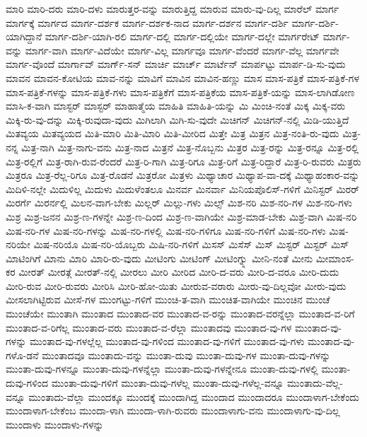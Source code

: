 {ಮಾರಿ
ಮಾರಿ-ದರು
ಮಾರಿ-ದಳು
ಮಾರುತ್ತರ-ವನ್ನು
ಮಾರುತ್ತಿದ್ದ
ಮಾರುವ
ಮಾರು-ವು-ದಿಲ್ಲ
ಮಾರೆಲ್
ಮಾರ್ಗ
ಮಾರ್ಗಕ್ಕೆ
ಮಾರ್ಗದ
ಮಾರ್ಗ-ದರ್ಶಕ
ಮಾರ್ಗ-ದರ್ಶಕ-ನಾದ
ಮಾರ್ಗ-ದರ್ಶನ
ಮಾರ್ಗ-ದರ್ಶಿ
ಮಾರ್ಗ-ದರ್ಶಿ-ಯಾಗಿದ್ದಾನೆ
ಮಾರ್ಗ-ದರ್ಶಿ-ಯಾಗಿ-ರಲಿ
ಮಾರ್ಗ-ದಲ್ಲಿ
ಮಾರ್ಗ-ದಲ್ಲಿಯೇ
ಮಾರ್ಗ-ದಲ್ಲೇ
ಮಾರ್ಗರೇಟ್
ಮಾರ್ಗ-ವನ್ನು
ಮಾರ್ಗ-ವಾಗಿ
ಮಾರ್ಗ-ವಿದೆಯೇ
ಮಾರ್ಗ-ವಿಲ್ಲ
ಮಾರ್ಗವೂ
ಮಾರ್ಗ-ವೆಂದರೆ
ಮಾರ್ಗ-ವೆಲ್ಲ
ಮಾರ್ಗವೇ
ಮಾರ್ಗ-ವೊಂದೆ
ಮಾರ್ಗಾವ್
ಮಾರ್ಗ್-ಸನ್
ಮಾರ್ಚಿ
ಮಾರ್ಚ್
ಮಾರ್ಟೆನ್
ಮಾರ್ಪಟ್ಟು
ಮಾರ್ಪ-ಡಿ-ಸು-ವುದು
ಮಾವನ
ಮಾವನ-ಕೋಟಿಯ
ಮಾವ-ನನ್ನು
ಮಾವಿಗೆ
ಮಾವಿನ
ಮಾವಿನ-ಹಣ್ಣು
ಮಾಸ
ಮಾಸ-ಪತ್ರಿಕೆ
ಮಾಸ-ಪತ್ರಿಕೆ-ಗಳ
ಮಾಸ-ಪತ್ರಿಕೆ-ಗಳನ್ನು
ಮಾಸ-ಪತ್ರಿಕೆ-ಗಳು
ಮಾಸ-ಪತ್ರಿಕೆಗೆ
ಮಾಸ-ಪತ್ರಿಕೆಯ
ಮಾಸ-ಪತ್ರಿಕೆ-ಯನ್ನು
ಮಾಸ-ಲಾಗಿಡೋಣ
ಮಾಸಿ-ಕ-ವಾಗಿ
ಮಾಸ್ಟರ್
ಮಾಸ್ಟರ್
ಮಾಹಾತ್ಮೆಯ
ಮಾಹಿತಿ
ಮಾಹಿತಿ-ಯನ್ನು
ಮಿ
ಮಿಂಚಿ-ನಂತೆ
ಮಿಕ್ಕ
ಮಿಕ್ಕ-ವರು
ಮಿಕ್ಕಿ-ರು-ವು-ದನ್ನು
ಮಿಕ್ಕಿ-ರುವುದಾ-ವುದು
ಮಿಗಿಲಾಗಿ
ಮಿಗಿ-ಸು-ವುದೇ
ಮಿಚಿಗನ್
ಮಿಚಿಗನ್-ನಲ್ಲಿ
ಮಿಡಿ-ಯುತ್ತಿದೆ
ಮಿತವ್ಯಯ
ಮಿತವ್ಯಯದ
ಮಿತಿ-ಮಾರಿ
ಮಿತಿ-ಮಿಾರಿ
ಮಿತಿ-ಮೀರಿದ
ಮಿತ್ತೇ
ಮಿತ್ರ
ಮಿತ್ರನ
ಮಿತ್ರ-ನಂತಿ-ರು-ವುದು
ಮಿತ್ರ-ನನ್ನ
ಮಿತ್ರ-ನಾಗಿ
ಮಿತ್ರ-ನಾಗು-ವನು
ಮಿತ್ರ-ನಾದ
ಮಿತ್ರನೆ
ಮಿತ್ರ-ನೊಬ್ಬನು
ಮಿತ್ರರ
ಮಿತ್ರ-ರನ್ನು
ಮಿತ್ರ-ರನ್ನೂ
ಮಿತ್ರ-ರಲ್ಲಿ
ಮಿತ್ರ-ರಲ್ಲಿಗೆ
ಮಿತ್ರ-ರಾಗಿ-ರುವ-ರೆಂದರೆ
ಮಿತ್ರ-ರಿ-ಗಾಗಿ
ಮಿತ್ರ-ರಿಗೂ
ಮಿತ್ರ-ರಿಗೆ
ಮಿತ್ರ-ರಿದ್ದಾರೆ
ಮಿತ್ರ-ರಿ-ರುವರು
ಮಿತ್ರರು
ಮಿತ್ರರೂ
ಮಿತ್ರ-ರೆಲ್ಲ-ರಿಗೂ
ಮಿತ್ರ-ರೊಡನೆ
ಮಿತ್ರರೋ
ಮಿತ್ರಳು
ಮಿಥ್ಯಾಚಾರ
ಮಿಥ್ಯಾಪ-ವಾ-ದಕ್ಕೆ
ಮಿಥ್ಯಾಹಂಕಾರ-ವನ್ನು
ಮಿದಿಳಿ-ನಲ್ಲೇ
ಮಿದುಳಿಲ್ಲ
ಮಿದುಳು
ಮಿದುಳೆಂತಲೂ
ಮಿನರ್ವ
ಮಿನರ್ವಾ
ಮಿನಿಯಪೊಲಿಸ್-ಗಳಿಗೆ
ಮಿನಿಸ್ಟರ್
ಮಿರರ್
ಮಿರರ್ಗೆ
ಮಿರರ್ನಲ್ಲಿ
ಮಿಲನ-ವಾಗ-ಬೇಕು
ಮಿಲ್ಲರ್
ಮಿಲ್ಲು-ಗಳು
ಮಿಲ್ಸ್
ಮಿಶ-ನರಿ
ಮಿಶ-ನರಿ-ಗಳ
ಮಿಶ-ನರಿ-ಗಳು
ಮಿಶ್ರ
ಮಿಶ್ರ-ಜನನ
ಮಿಶ್ರ-ಣ-ಗಳನ್ನೇ
ಮಿಶ್ರ-ಣ-ದಿಂದ
ಮಿಶ್ರ-ಣ-ವಾಗಿಯೇ
ಮಿಶ್ರ-ಮಾಡ-ಬೇಕು
ಮಿಶ್ರ-ವಾಗಿ
ಮಿಷ-ನರಿ
ಮಿಷ-ನರಿ-ಗಳ
ಮಿಷ-ನರಿ-ಗಳನ್ನು
ಮಿಷ-ನರಿ-ಗಳಲ್ಲಿ
ಮಿಷ-ನರಿ-ಗಳಿಗೂ
ಮಿಷ-ನರಿ-ಗಳಿಗೆ
ಮಿಷ-ನರಿ-ಗಳು
ಮಿಷ-ನರಿಯೇ
ಮಿಷ-ನರಿಯೊ
ಮಿಷ-ನರಿ-ಯೊಬ್ಬರು
ಮಿಷಿ-ನರಿ-ಗಳಿಗೆ
ಮಿಸಸ್
ಮಿಸೆಸ್
ಮಿಸ್
ಮಿಸ್ಟರ್
ಮಿಸ್ಟರ್
ಮಿಸ್
ಮಿಾಟಿಂಗಿಗೆ
ಮಿಾನು
ಮಿಾರಿ
ಮಿಾರಿ-ರು-ವುದು
ಮೀಟಿಂಗು
ಮೀಟಿಂಗ್
ಮೀಟಿಂಗ್ನ್ನು
ಮೀನಿ-ನಂತೆ
ಮೀನು
ಮೀಮಾಂಸ-ಕರ
ಮೀರತ್
ಮೀರತ್ಗೆ
ಮೀರತ್-ನಲ್ಲಿ
ಮೀರಲು
ಮೀರಿ
ಮೀರಿದ
ಮೀರಿ-ದ-ವರು
ಮೀರಿ-ದ-ವರೂ
ಮೀರಿ-ದುದು
ಮೀರಿ-ರುವ
ಮೀರಿ-ರುವರು
ಮೀರಿಸಿ
ಮೀರಿ-ಹೋ-ಯಿತು
ಮೀರುವ-ವರಾರು
ಮೀರು-ವು-ದಿಲ್ಲವೋ
ಮೀರು-ವುದು
ಮೀಸಲಾಗಿಟ್ಟಿರುವ
ಮೀಸೆ-ಗಳ
ಮುಂಗಟ್ಟು-ಗಳಿಗೆ
ಮುಂಚಿ-ತ-ವಾಗಿ
ಮುಂಚಿತ-ವಾಗಿಯೇ
ಮುಂಚಿನ
ಮುಂಚೆ
ಮುಂಚೆಯೇ
ಮುಂತಾಗಿ
ಮುಂತಾದ
ಮುಂತಾದ-ವರ
ಮುಂತಾದ-ವ-ರನ್ನು
ಮುಂತಾದ-ವರನ್ನೆಲ್ಲಾ
ಮುಂತಾದ-ವ-ರಿಗೆ
ಮುಂತಾದ-ವ-ರಿಗೆಲ್ಲ
ಮುಂತಾದ-ವರು
ಮುಂತಾದ-ವ-ರೆಲ್ಲಾ
ಮುಂತಾದವು
ಮುಂತಾದ-ವು-ಗಳ
ಮುಂತಾದ-ವು-ಗಳನ್ನು
ಮುಂತಾದ-ವು-ಗಳಲ್ಲೆಲ್ಲ
ಮುಂತಾದ-ವು-ಗಳಿಂದ
ಮುಂತಾದ-ವು-ಗಳಿಗೆ
ಮುಂತಾದ-ವು-ಗಳು
ಮುಂತಾದ-ವು-ಗಳೊ-ಡನೆ
ಮುಂತಾದವೂ
ಮುಂತಾದು-ವನ್ನು
ಮುಂತಾ-ದುವು
ಮುಂತಾ-ದುವು-ಗಳ
ಮುಂತಾ-ದುವು-ಗಳನ್ನು
ಮುಂತಾ-ದುವು-ಗಳನ್ನೂ
ಮುಂತಾ-ದುವು-ಗಳನ್ನೆಲ್ಲಾ
ಮುಂತಾ-ದುವು-ಗಳನ್ನೇನೂ
ಮುಂತಾ-ದುವು-ಗಳಲ್ಲಿ
ಮುಂತಾ-ದುವು-ಗಳಿಂದ
ಮುಂತಾ-ದುವು-ಗಳಿಗೆ
ಮುಂತಾ-ದುವು-ಗಳೆಲ್ಲ
ಮುಂತಾ-ದುವು-ಗಳೆಲ್ಲ-ವನ್ನೂ
ಮುಂತಾದು-ವೆಲ್ಲ-ವನ್ನೂ
ಮುಂತಾದು-ವೆಲ್ಲಾ
ಮುಂದಕ್ಕೂ
ಮುಂದಕ್ಕೆ
ಮುಂದಾಗಿದ್ದ
ಮುಂದಾದ
ಮುಂದಾದರೂ
ಮುಂದಾಳಾಗ-ಬೇಕೆಂದು
ಮುಂದಾಳಾಗ-ಬೇಕೆಂಬ
ಮುಂದಾ-ಳಾಗಿ
ಮುಂದಾ-ಳಾಗಿ-ರುವರು
ಮುಂದಾಳಾಗು-ವನು
ಮುಂದಾಳಾಗು-ವು-ದಿಲ್ಲ
ಮುಂದಾಳು
ಮುಂದಾಳು-ಗಳನ್ನು
}
